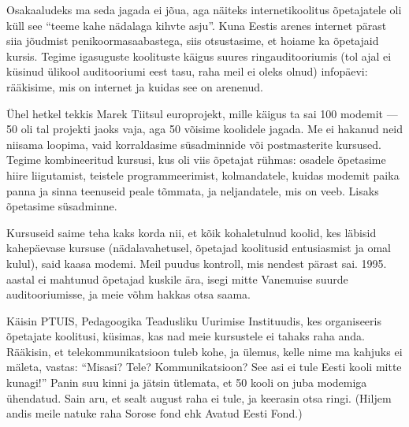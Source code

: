 
Osakaaludeks ma seda jagada ei jõua, aga näiteks internetikoolitus 
õpetajatele oli küll see \enquote{teeme kahe nädalaga kihvte asju}. Kuna Eestis 
arenes internet pärast siia jõudmist
penikoormasaabastega, siis otsustasime, et hoiame ka õpetajaid 
kursis. Tegime igasuguste koolituste käigus suures ringauditooriumis (tol 
ajal ei küsinud ülikool auditooriumi eest tasu, raha meil ei oleks 
olnud) infopäevi: rääkisime, mis on internet ja kuidas see on arenenud. 

Ühel hetkel tekkis Marek Tiitsul 
europrojekt, mille käigus ta sai 100 modemit --- 50 oli tal projekti jaoks vaja, 
aga 50 võisime koolidele jagada. Me ei hakanud neid niisama loopima, vaid 
korraldasime süsadminnide või postmasterite kursused. Tegime 
kombineeritud kursusi, kus oli viis õpetajat rühmas: osadele
õpetasime hiire liigutamist, teistele programmeerimist, 
kolmandatele, kuidas modemit paika panna ja sinna teenuseid peale 
tõmmata, ja neljandatele, mis on veeb. Lisaks õpetasime 
süsadminne. 

Kursuseid saime teha kaks korda nii, et kõik 
kohaletulnud koolid, kes läbisid kahepäevase kursuse (nädalavahetusel, õpetajad koolitusid entusiasmist ja omal kulul), 
said kaasa modemi. Meil puudus kontroll, mis nendest pärast sai. 1995. 
aastal ei mahtunud õpetajad kuskile ära, isegi mitte Vanemuise 
suurde auditooriumisse, ja meie võhm hakkas otsa 
saama. 

Käisin PTUIS, Pedagoogika Teadusliku Uurimise Instituudis, kes 
organiseeris õpetajate koolitusi, küsimas, kas nad meie kursustele ei tahaks 
raha anda. Rääkisin, et telekommunikatsioon tuleb kohe, ja 
ülemus, kelle nime ma kahjuks ei mäleta, vastas: \enquote{Misasi? Tele? 
Kommunikatsioon? See asi ei tule Eesti kooli mitte kunagi!} Panin suu kinni 
ja jätsin ütlemata, et 50 kooli on juba modemiga ühendatud. Sain aru, et sealt august raha ei tule, ja keerasin otsa 
ringi. (Hiljem andis meile natuke raha Sorose 
fond ehk Avatud Eesti Fond.)


